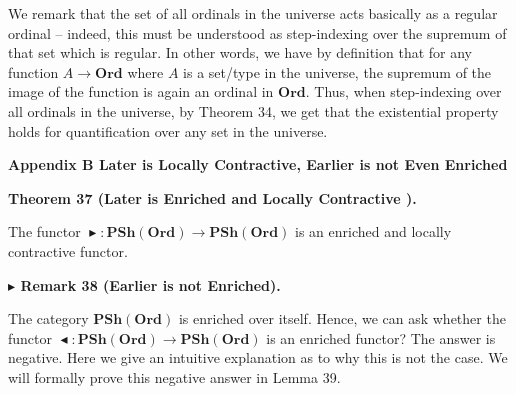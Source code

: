 \documentclass[10pt,a4paper]{article}
\begin{document}
 
 
We remark that the set of all ordinals in the universe acts basically as a regular ordinal – indeed, this must be understood as step-indexing over the supremum of that set which is regular. In other words, we have by definition that for any function $A\to\mathbf{Ord}$ where $A$ is a set/type in the universe, the supremum of the image of the function is again an ordinal in $\mathbf{Ord}$. Thus, when step-indexing over all ordinals in the universe, by Theorem 34, we get that the existential property holds for quantification over any set in the universe.\par
 
 
 
 


 
\par\medskip\noindent\textbf{Appendix B Later is Locally Contractive, Earlier is not Even Enriched}\par
 
 
\par\medskip\noindent\textbf{Theorem 37 (Later is Enriched and Locally Contractive ).}\par
 
 
The functor $\mathop{\blacktriangleright}:\mathbf{PSh}(\mathbf{Ord})\to\mathbf{PSh}(\mathbf{Ord})$ is an enriched and locally contractive functor.\par
 
 
 
 
\par\medskip\noindent\textbf{$\blacktriangleright$ Remark 38 (Earlier is not Enriched).}\par
 
 
The category $\mathbf{PSh}(\mathbf{Ord})$ is enriched over itself. Hence, we can ask whether the functor $\mathop{\blacktriangleleft}:\mathbf{PSh}(\mathbf{Ord})\to\mathbf{PSh}(\mathbf{Ord})$ is an enriched functor? The answer is negative. Here we give an intuitive explanation as to why this is not the case. We will formally prove this negative answer in Lemma 39.\par
 
\end{document}
